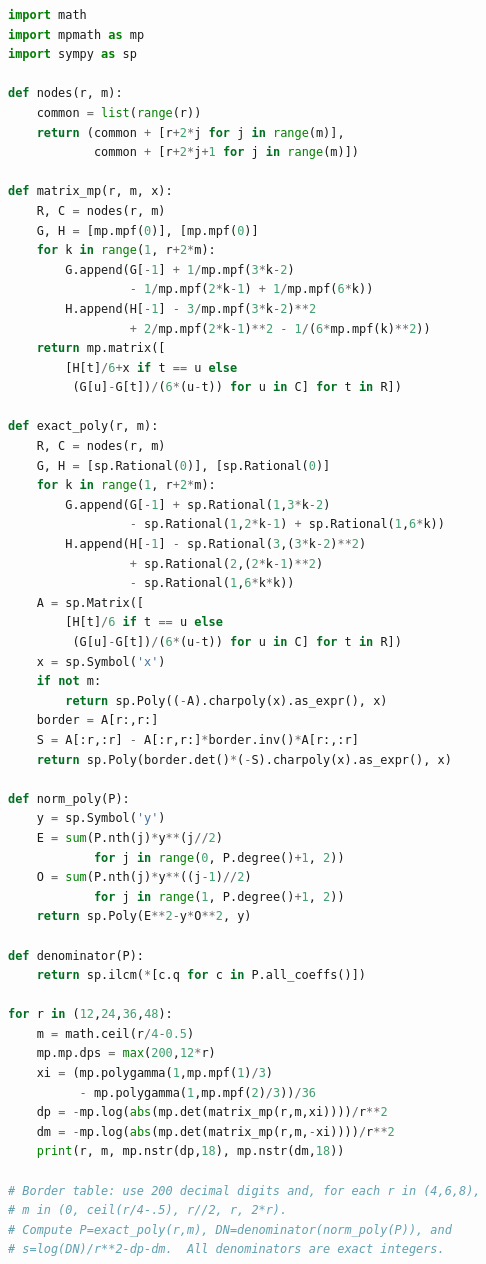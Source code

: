\documentclass[11pt,a4paper]{article}
\theoremstyle{definition}
\theoremstyle{remark}
\begin{document}
\begin{lstlisting}[language=Python,basicstyle=\ttfamily\scriptsize,breaklines=true]
import math
import mpmath as mp
import sympy as sp

def nodes(r, m):
    common = list(range(r))
    return (common + [r+2*j for j in range(m)],
            common + [r+2*j+1 for j in range(m)])

def matrix_mp(r, m, x):
    R, C = nodes(r, m)
    G, H = [mp.mpf(0)], [mp.mpf(0)]
    for k in range(1, r+2*m):
        G.append(G[-1] + 1/mp.mpf(3*k-2)
                 - 1/mp.mpf(2*k-1) + 1/mp.mpf(6*k))
        H.append(H[-1] - 3/mp.mpf(3*k-2)**2
                 + 2/mp.mpf(2*k-1)**2 - 1/(6*mp.mpf(k)**2))
    return mp.matrix([
        [H[t]/6+x if t == u else
         (G[u]-G[t])/(6*(u-t)) for u in C] for t in R])

def exact_poly(r, m):
    R, C = nodes(r, m)
    G, H = [sp.Rational(0)], [sp.Rational(0)]
    for k in range(1, r+2*m):
        G.append(G[-1] + sp.Rational(1,3*k-2)
                 - sp.Rational(1,2*k-1) + sp.Rational(1,6*k))
        H.append(H[-1] - sp.Rational(3,(3*k-2)**2)
                 + sp.Rational(2,(2*k-1)**2)
                 - sp.Rational(1,6*k*k))
    A = sp.Matrix([
        [H[t]/6 if t == u else
         (G[u]-G[t])/(6*(u-t)) for u in C] for t in R])
    x = sp.Symbol('x')
    if not m:
        return sp.Poly((-A).charpoly(x).as_expr(), x)
    border = A[r:,r:]
    S = A[:r,:r] - A[:r,r:]*border.inv()*A[r:,:r]
    return sp.Poly(border.det()*(-S).charpoly(x).as_expr(), x)

def norm_poly(P):
    y = sp.Symbol('y')
    E = sum(P.nth(j)*y**(j//2)
            for j in range(0, P.degree()+1, 2))
    O = sum(P.nth(j)*y**((j-1)//2)
            for j in range(1, P.degree()+1, 2))
    return sp.Poly(E**2-y*O**2, y)

def denominator(P):
    return sp.ilcm(*[c.q for c in P.all_coeffs()])

for r in (12,24,36,48):
    m = math.ceil(r/4-0.5)
    mp.mp.dps = max(200,12*r)
    xi = (mp.polygamma(1,mp.mpf(1)/3)
          - mp.polygamma(1,mp.mpf(2)/3))/36
    dp = -mp.log(abs(mp.det(matrix_mp(r,m,xi))))/r**2
    dm = -mp.log(abs(mp.det(matrix_mp(r,m,-xi))))/r**2
    print(r, m, mp.nstr(dp,18), mp.nstr(dm,18))

# Border table: use 200 decimal digits and, for each r in (4,6,8),
# m in (0, ceil(r/4-.5), r//2, r, 2*r).
# Compute P=exact_poly(r,m), DN=denominator(norm_poly(P)), and
# s=log(DN)/r**2-dp-dm.  All denominators are exact integers.
\end{lstlisting}
\end{document}
